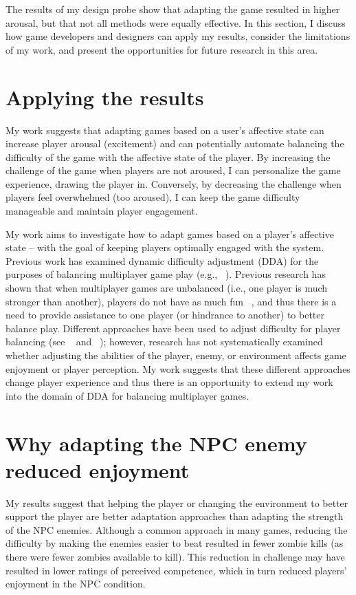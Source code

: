 
The results of my design probe show that adapting the game resulted in higher arousal, but that not all methods were equally effective. In this section, I discuss how game developers and designers can apply my results, consider the limitations of my work, and present the opportunities for future research in this area.

\section{Applying the results}
My work suggests that adapting games based on a user's affective state can increase player arousal (excitement) and can potentially automate balancing the difficulty of the game with the affective state of the player. By increasing the challenge of the game when players are not aroused, I can personalize the game experience, drawing the player in. Conversely, by decreasing the challenge when players feel overwhelmed (too aroused), I can keep the game difficulty manageable and maintain player engagement.

My work aims to investigate how to adapt games based on a player's affective state – with the goal of keeping players optimally engaged with the system. Previous work has examined dynamic difficulty adjustment (DDA) for the purposes of balancing multiplayer game play (e.g., ~\cite{bateman2011target}). Previous research has shown that when multiplayer games are unbalanced (i.e., one player is much stronger than another), players do not have as much fun ~\cite{vicencio2014effectiveness}, and thus there is a need to provide assistance to one player (or hindrance to another) to better balance play. Different approaches have been used to adjust difficulty for player balancing (see ~\cite{bateman2011target} and ~\cite{vicencio2014effectiveness}); however, research has not systematically examined whether adjusting the abilities of the player, enemy, or environment affects game enjoyment or player perception. My work suggests that these different approaches change player experience and thus there is an opportunity to extend my work into the domain of DDA for balancing multiplayer games.

\section{Why adapting the NPC enemy reduced enjoyment}
My results suggest that helping the player or changing the environment to better support the player are better adaptation approaches than adapting the strength of the NPC enemies. Although a common approach in many games, reducing the difficulty by making the enemies easier to beat resulted in fewer zombie kills (as there were fewer zombies available to kill). This reduction in challenge may have resulted in lower ratings of perceived competence, which in turn reduced players' enjoyment in the NPC condition.


